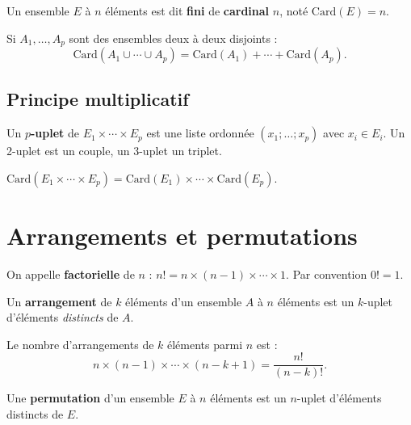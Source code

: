 \documentclass[11pt,a4paper,openany]{book}
\theoremstyle{definition}
\begin{document}
    \begin{Définition}
        Un ensemble $E$ à $n$ éléments est dit \textbf{fini} de \textbf{cardinal} $n$,
        noté $\mathrm{Card}(E)=n$.
    \end{Définition}

    \begin{Propriété}
        Si $A_1,\ldots,A_p$ sont des ensembles deux à deux disjoints :
        \[
            \mathrm{Card}(A_1\cup\cdots\cup A_p)=\mathrm{Card}(A_1)+\cdots+\mathrm{Card}(A_p).
        \]
    \end{Propriété}

    \subsection{Principe multiplicatif}
    \begin{Définition}
        Un \textbf{$p$-uplet} de $E_1\times\cdots\times E_p$ est une liste ordonnée
        $(x_1;\ldots;x_p)$ avec $x_i\in E_i$. Un 2-uplet est un couple, un 3-uplet un triplet.
    \end{Définition}

    \begin{Propriété}
        $\mathrm{Card}(E_1\times\cdots\times E_p)=\mathrm{Card}(E_1)\times\cdots\times
        \mathrm{Card}(E_p)$.
    \end{Propriété}

    \section{Arrangements et permutations}
    \begin{Définition}
        On appelle \textbf{factorielle} de $n$ : $n!=n\times(n-1)\times\cdots\times 1$.
        Par convention $0!=1$.
    \end{Définition}

    \begin{Définition}
        Un \textbf{arrangement} de $k$ éléments d'un ensemble $A$ à $n$ éléments est un
        $k$-uplet d'éléments \emph{distincts} de $A$.
    \end{Définition}

    \begin{Propriété}
        Le nombre d'arrangements de $k$ éléments parmi $n$ est :
        \[
            n\times(n-1)\times\cdots\times(n-k+1)=\frac{n!}{(n-k)!}.
        \]
    \end{Propriété}

    \begin{Définition}
        Une \textbf{permutation} d'un ensemble $E$ à $n$ éléments est un $n$-uplet
        d'éléments distincts de $E$.
    \end{Définition}
\end{document}
